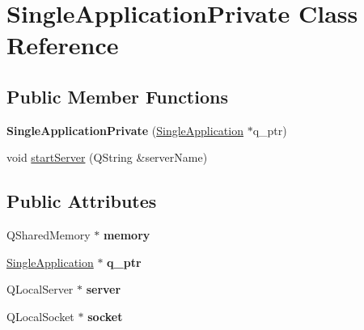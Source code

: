 \hypertarget{class_single_application_private}{}\section{Single\+Application\+Private Class Reference}
\label{class_single_application_private}
\subsection*{Public Member Functions}
\begin{DoxyCompactItemize}
\item 
\hypertarget{class_single_application_private_a3bdf4415aaa8f5829e8637f0c75cb697}{}{\bfseries Single\+Application\+Private} (\hyperlink{class_single_application}{Single\+Application} $\ast$q\+\_\+ptr)\label{class_single_application_private_a3bdf4415aaa8f5829e8637f0c75cb697}

\item 
void \hyperlink{class_single_application_private_a4d7284bd84a7a08aeaa90c7c350bb1cd}{start\+Server} (Q\+String \&server\+Name)
\end{DoxyCompactItemize}
\subsection*{Public Attributes}
\begin{DoxyCompactItemize}
\item 
\hypertarget{class_single_application_private_a68209c957c6bf79051354a8ecf4a6b49}{}Q\+Shared\+Memory $\ast$ {\bfseries memory}\label{class_single_application_private_a68209c957c6bf79051354a8ecf4a6b49}

\item 
\hypertarget{class_single_application_private_aeace2f08f4ed4642b4a5f7c4408a14f2}{}\hyperlink{class_single_application}{Single\+Application} $\ast$ {\bfseries q\+\_\+ptr}\label{class_single_application_private_aeace2f08f4ed4642b4a5f7c4408a14f2}

\item 
\hypertarget{class_single_application_private_ae95f6462bd243b08cdff4815d671a21f}{}Q\+Local\+Server $\ast$ {\bfseries server}\label{class_single_application_private_ae95f6462bd243b08cdff4815d671a21f}

\item 
\hypertarget{class_single_application_private_a4557ba81fb05cf961cb2285b889c7fff}{}Q\+Local\+Socket $\ast$ {\bfseries socket}\label{class_single_application_private_a4557ba81fb05cf961cb2285b889c7fff}

\end{DoxyCompactItemize}


